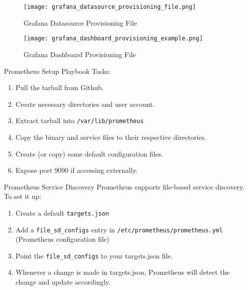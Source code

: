 \documentclass[14pt,compress,usenames,dvipsnames,aspectratio=169]{beamer}
\begin{document}
\begin{figure}
    \centering
    \texttt{[image: grafana\_datasource\_provisioning\_file.png]}
    \caption{Grafana Datasource Provisioning File}
    \label{fig:enter-label}
\end{figure}
 
\begin{figure}
    \centering
    \texttt{[image: grafana\_dashboard\_provisioning\_example.png]}
    \caption{Grafana Dashboard Provisioning File}
    \label{fig:enter-label}
\end{figure}


\begin{frame}{Prometheus Setup Playbook}
    Tasks:
    \begin{enumerate}
        \item{Pull the tarball from Github.} 
        \item{Create necessary directories and user account.} 
        \item{Extract tarball into \texttt{/var/lib/prometheus} } 
        \item{Copy the binary and service files to their respective directories.} 
        \item{Create (or copy) some default configuration files.} 
        \item{Expose port 9090 if accessing externally.} 
    \end{enumerate}
\end{frame}

\begin{frame}{Prometheus Service Discovery}
    Prometheus supports file-based service discovery.  
    To set it up:
    \begin{enumerate}
        \item{Create a default \texttt{targets.json}} 
        \item{Add a \texttt{file\_sd\_configs} entry in \texttt{/etc/prometheus/prometheus.yml}
            (Prometheus configuration file)} 
        \item{Point the \texttt{file\_sd\_configs} to your targets.json file.} 
        \item{Whenever a change is made in targets.json, Prometheus will detect the
            change and update accordingly.}
    \end{enumerate}
\end{frame}
\end{document}
